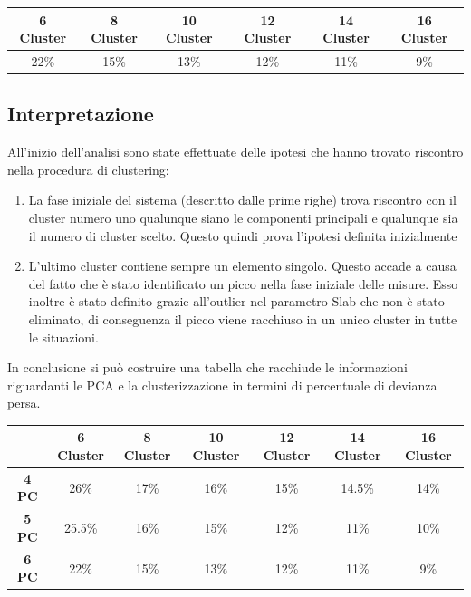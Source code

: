  
 \begin{center}
 	\begin{tabular}{|c|c|c|c|c|c|}
 		\hline
 		\textbf{6 Cluster} & \textbf{8 Cluster} & \textbf{10 Cluster} &\textbf{12 Cluster}& \textbf{14 Cluster} & \textbf{16 Cluster} \\
 		\hline
 		22\% & 15\%& 13\% & 12\% & 11\% & 9\% \\
 		\hline
 	\end{tabular}
 \end{center}

\subsection{Interpretazione}
All'inizio dell'analisi sono state effettuate delle ipotesi che hanno trovato riscontro nella procedura di clustering:
\begin{enumerate}
	\item La fase iniziale del sistema (descritto dalle prime righe) trova riscontro con il cluster numero uno qualunque siano le componenti principali e qualunque sia il numero di cluster scelto. Questo quindi prova l'ipotesi definita inizialmente
	\item L'ultimo cluster contiene sempre un elemento singolo. Questo accade a causa del fatto che è stato identificato un picco nella fase iniziale delle misure. Esso inoltre è stato definito grazie all'outlier nel parametro Slab che non è stato eliminato, di conseguenza il picco viene racchiuso in un unico cluster in tutte le situazioni.
\end{enumerate}
\vspace{0.5cm}
In conclusione si può costruire una tabella che racchiude le informazioni riguardanti le PCA e la clusterizzazione in termini di percentuale di devianza persa.
 \begin{center}
	\begin{tabular}{|c|c|c|c|c|c|c|}
		\hline
		& \textbf{6 Cluster} & \textbf{8 Cluster} & \textbf{10 Cluster} &\textbf{12 Cluster}& \textbf{14 Cluster} & \textbf{16 Cluster} \\
		\hline
		\textbf{4 PC} & 26\%& 17\% & 16\% & 15\% & 14.5\% & 14\% \\

	\textbf{5 PC} & 25.5\%& 16\% & 15\% & 12\% & 11\% & 10\% \\

		\textbf{6 PC} & 22\% & 15\%& 13\% & 12\% & 11\% & 9\% \\
		\hline
	\end{tabular}
\end{center}

